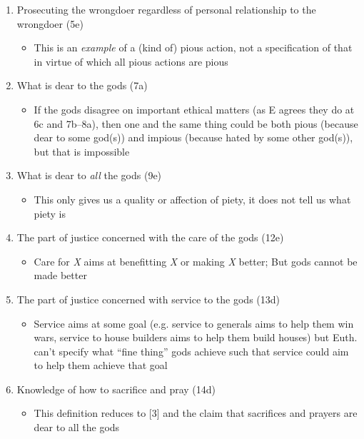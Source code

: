 \documentclass[oneside]{article}
\begin{document}
\begin{enumerate}

\item Prosecuting the wrongdoer regardless of personal relationship to the wrongdoer (5e)

\begin{itemize}\item{This is an \emph{example} of a (kind of) pious action, not a specification of that in virtue of which all pious actions are pious}\end{itemize}

\item{What is dear to the gods (7a)}

\begin{itemize}\item{If the gods disagree on important ethical matters (as E agrees they do at 6c and 7b--8a), then one and the same thing could be both pious (because dear to some god(s)) and impious (because hated by some other god(s)), but that is impossible}\end{itemize}

\item{What is dear to \emph{all} the gods (9e)}

\begin{itemize}\item{This only gives us a quality or affection of piety, it does not tell us what piety is}\end{itemize}

\item{The part of justice concerned with the care of the gods (12e)}

\begin{itemize}\item{Care for \emph{X} aims at benefitting \emph{X} or making \emph{X} better; But gods cannot be made better}\end{itemize}

\item{The part of justice concerned with service to the gods (13d)}

\begin{itemize}\item{Service aims at some goal (e.g. service to generals aims to help them win wars, service to house builders aims to help them build houses) but Euth. can't specify what ``fine thing'' gods achieve such that service could aim to help them achieve that goal}\end{itemize} 

\item{Knowledge of how to sacrifice and pray (14d)}

\begin{itemize}\item{This definition reduces to [3] and the claim that sacrifices and prayers are dear to all the gods}\end{itemize}

\end{enumerate}
\end{document}
